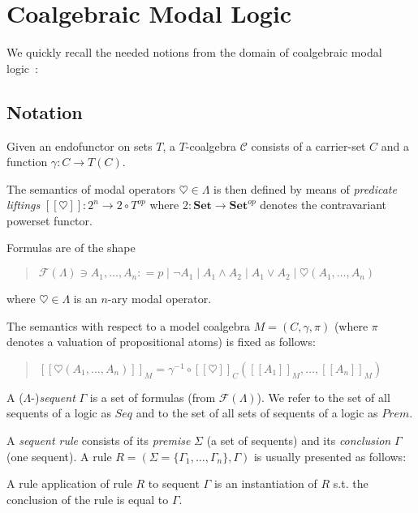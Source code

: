 \documentclass{llncs}
\newcommand{\hearts}{\heartsuit}
\newcommand{\sem}[1]{[\![#1]\!]}
\begin{document}
\section{Coalgebraic Modal Logic}

We quickly recall the needed notions from the domain of coalgebraic modal logic~\cite{SchroderPattinson09}:

\subsection{Notation}

Given an endofunctor on sets $T$, a $T$-coalgebra $\mathcal{C}$ consists of a
carrier-set $C$ and a function $\gamma:C\rightarrow T(C)$.

The semantics of modal operators $\hearts\in\Lambda$ is then defined by means
of \emph{predicate liftings} $\sem{\hearts}:2^n\rightarrow2\circ T^{op}$ where
$2:\mathbf{Set}\rightarrow\mathbf{Set}^{op}$ denotes the contravariant powerset functor.

Formulas are of the shape
\begin{quote}
$\mathcal{F}(\Lambda)\ni A_1,\ldots,A_n\mathrel{\mathop:}=p\mid \neg A_1 \mid A_1\wedge A_2\mid A_1\vee A_2 \mid \hearts(A_1,\ldots,A_n)$
\end{quote}
where $\hearts\in\Lambda$ is an $n$-ary modal operator.

The semantics with respect to a model coalgebra $M=(C,\gamma,\pi)$ (where $\pi$ denotes a
valuation of propositional atoms) is fixed as follows:
\begin{quote}
$\sem{\hearts(A_1,\ldots,A_n)}_M=\gamma^{-1}\circ\sem{\hearts}_C(\sem{A_1}_M,\ldots,\sem{A_n}_M)$
\end{quote}

A ($\Lambda$-)\emph{sequent} $\Gamma$ is a set of formulas (from $\mathcal{F}(\Lambda)$). We refer
to the set of all sequents of a logic as $Seq$ and to the set of all sets of sequents of a
logic as $Prem$.

A \emph{sequent rule} consists of its \emph{premise} $\Sigma$ (a set of sequents)
and its \emph{conclusion} $\Gamma$ (one sequent). A rule $R=(\Sigma=\{\Gamma_1,\ldots,\Gamma_n\},\Gamma)$ 
is usually presented as follows:
\begin{quote}
\centerline{}
\end{quote}

A rule application of rule $R$ to sequent $\Gamma$ is an instantiation of $R$
s.t. the conclusion of the rule is equal to $\Gamma$.
\end{document}
